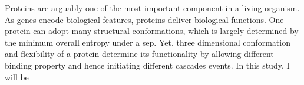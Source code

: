 Proteins are arguably one of the most important component in a living organism. As genes encode biological features, proteins deliver biological functions. One protein can adopt many structural conformations, which is largely determined by the minimum overall entropy under a sep. Yet, three dimensional conformation and flexibility of a protein determine its functionality by allowing different binding property and hence initiating different cascades events. In this study, I will be 